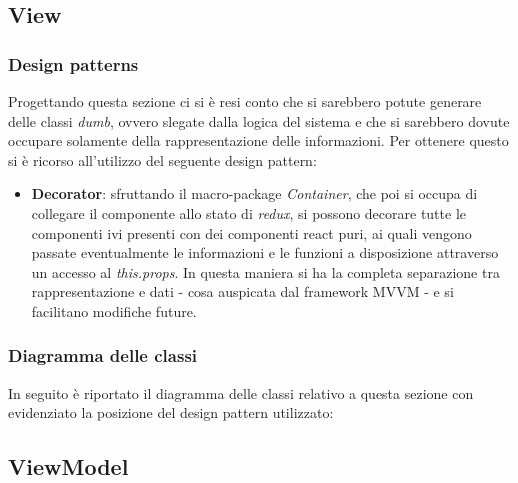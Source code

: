



\subsection{View}
\subsubsection{Design patterns}
Progettando questa sezione ci si è resi conto che si sarebbero potute generare delle classi \emph{dumb}, ovvero slegate dalla logica del sistema e che si sarebbero dovute occupare solamente della rappresentazione delle informazioni. Per ottenere questo si è ricorso all'utilizzo del seguente design pattern:
\begin{itemize}
	\item \textbf{Decorator}: sfruttando il macro-package \emph{Container}, che poi si occupa di collegare il componente allo stato di \emph{redux}, si possono decorare tutte le componenti ivi presenti con dei componenti react puri, ai quali vengono passate eventualmente le informazioni e le funzioni a disposizione attraverso un accesso al \emph{this.props}. In questa maniera si ha la completa separazione tra rappresentazione e dati - cosa auspicata dal framework MVVM - e si facilitano modifiche future.
\end{itemize}

\subsubsection{Diagramma delle classi}
In seguito è riportato il diagramma delle classi relativo a questa sezione con evidenziato la posizione del design pattern utilizzato:


\subsection{ViewModel}
